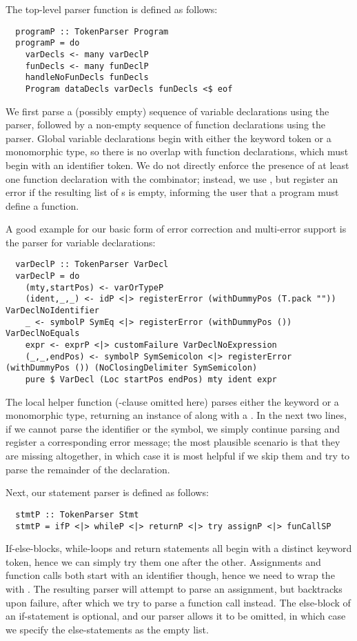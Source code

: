 The top-level parser function is defined as follows:
\begin{verbatim}
  programP :: TokenParser Program
  programP = do
    varDecls <- many varDeclP
    funDecls <- many funDeclP
    handleNoFunDecls funDecls
    Program dataDecls varDecls funDecls <$ eof
\end{verbatim}
%
We first parse a (possibly empty) sequence of variable declarations using the
 parser, followed by a non-empty sequence of function
declarations using the  parser.
Global variable declarations begin with either the  keyword token or
a monomorphic type, so there is no overlap with function declarations, which
must begin with an identifier token.
We do not directly enforce the presence of at least one function declaration
with the  combinator; instead, we use , but register an
error if the resulting list of s is empty, informing the user
that a program must define a  function.

A good example for our basic form of error correction and multi-error support is
the parser for variable declarations:
\begin{verbatim}
  varDeclP :: TokenParser VarDecl
  varDeclP = do
    (mty,startPos) <- varOrTypeP
    (ident,_,_) <- idP <|> registerError (withDummyPos (T.pack "")) VarDeclNoIdentifier
    _ <- symbolP SymEq <|> registerError (withDummyPos ()) VarDeclNoEquals
    expr <- exprP <|> customFailure VarDeclNoExpression
    (_,_,endPos) <- symbolP SymSemicolon <|> registerError (withDummyPos ()) (NoClosingDelimiter SymSemicolon)
    pure $ VarDecl (Loc startPos endPos) mty ident expr
\end{verbatim}
%
The local  helper function (-clause omitted
here) parses either the  keyword or a monomorphic type, returning an
instance of  along with a .
In the next two lines, if we cannot parse the identifier or the \spl{=} symbol,
we simply continue parsing and register a corresponding error message; the most
plausible scenario is that they are missing altogether, in which case it is most
helpful if we skip them and try to parse the remainder of the declaration.

Next, our statement parser is defined as follows:
\begin{verbatim}
  stmtP :: TokenParser Stmt
  stmtP = ifP <|> whileP <|> returnP <|> try assignP <|> funCallSP
\end{verbatim}
%
If-else-blocks, while-loops and return statements all begin with a distinct
keyword token, hence we can simply try them one after the other.
Assignments and function calls both start with an identifier though, hence we
need to wrap the  with . The resulting parser will
attempt to parse an assignment, but backtracks upon failure, after which we try
to parse a function call instead.
The else-block of an if-statement is optional, and our parser allows it to be
omitted, in which case we specify the else-statements as the empty list.

